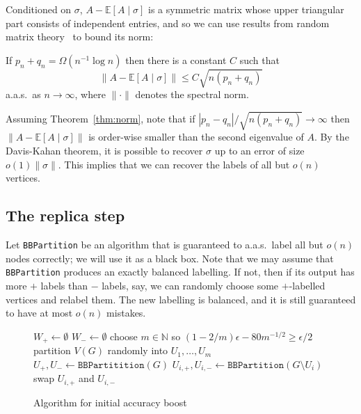 \documentclass[EJP]{ejpecp}
\newcommand{\N}{\mathbb{N}}
\newcommand{\E}{\mathbb{E}}
\newcommand{\1}[1]{\mathbbm{1}_{\{#1\}}}
\newcommand{\symdiff}{\Delta}
\begin{document}
Conditioned on $\sigma$, $A - \E[A \mid \sigma]$ is a
symmetric matrix whose upper triangular part consists of independent entries, and so we can use results from random matrix
theory~\cite{Vu:07,Seginer:00} to bound its norm:
\begin{theorem}\label{thm:norm}
 If $p_n + q_n = \Omega(n^{-1} \log n)$ then there is a constant $C$ such that
 \[
  \|A - \E[A \mid \sigma]\| \le C \sqrt{n (p_n + q_n)}
 \]
 a.a.s.\ as $n \to \infty$, where $\|\cdot\|$ denotes the spectral
 norm.
\end{theorem}

Assuming Theorem~\ref{thm:norm}, note that if
$|p_n - q_n|/\sqrt{n (p_n + q_n)} \to \infty$ then $\|A - \E[A \mid \sigma]\|$ is order-wise
smaller than the second eigenvalue of $A$. By the Davis-Kahan theorem, it is possible to
recover $\sigma$ up to an error of size $o(1) \|\sigma\|$. This implies that we can recover the labels
of all but $o(n)$ vertices.

\subsection{The replica step}\label{sec:first-step}

Let {\tt BBPartition} be an algorithm that is guaranteed to a.a.s.\ label all but $o(n)$ nodes correctly;
we will use it as a black box.
Note that we may assume that {\tt BBPartition} produces an exactly
balanced labelling. If not, then if its output has more $+$ labels
than $-$ labels, say, we can randomly choose some $+$-labelled vertices
and relabel them. The new labelling is balanced, and it is
still guaranteed to have at most $o(n)$ mistakes.

\begin{figure}
\begin{algorithm}[H]
 \LinesNumbered

 \BlankLine

 $W_+ \leftarrow \emptyset$\;
 $W_- \leftarrow \emptyset$\;
 choose $m \in \N$ so $(1-2/m) \epsilon - 80 m^{-1/2} \ge \epsilon/2$\;
 partition $V(G)$ randomly into $U_1, \dots, U_m$\;
 $U_+, U_- \leftarrow \mathtt{BBPartitition}(G)$\;
 \label{alg:first-initial-partition}
  {
  $U_{i,+}, U_{i,-} \leftarrow \mathtt{BBPartition}(G \setminus U_i)$\;
    \If{$|U_{i,+} \symdiff U_+| \ge n/2$ \label{alg:first-before-align}}
     {swap $U_{i,+}$ and $U_{i,-}$\; \label{alg:first-align} }
 }
\caption{Algorithm for initial accuracy boost}
\label{alg:first}
\end{algorithm}
\end{figure}
\end{document}
